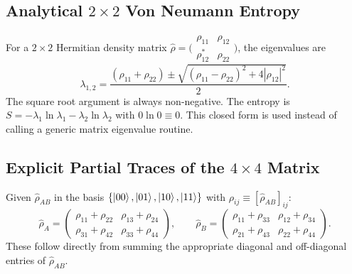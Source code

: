 \documentclass[12pt,a4paper]{article}
\newcommand{\rhohat}{\hat{\rho}}
\begin{document}
\subsection{\texorpdfstring{Analytical $2\times2$ Von Neumann Entropy}{Analytical 2x2 Von Neumann Entropy}}
\label{app:entropy2x2}

For a $2\times2$ Hermitian density matrix
$\hat{\rho}=\bigl(\begin{smallmatrix}\rho_{11}&\rho_{12}\\\rho_{12}^*&\rho_{22}
\end{smallmatrix}\bigr)$,
the eigenvalues are
\begin{equation}
  \lambda_{1,2} = \frac{(\rho_{11}+\rho_{22})
    \pm\sqrt{(\rho_{11}-\rho_{22})^2+4|\rho_{12}|^2}}{2}.
  \label{app:eig2x2}
\end{equation}
The square root argument is always non-negative.  The entropy is
$S = -\lambda_1\ln\lambda_1 - \lambda_2\ln\lambda_2$ with $0\ln0\equiv0$.
This closed form is used instead of calling a generic matrix eigenvalue
routine.

\subsection{\texorpdfstring{Explicit Partial Traces of the $4\times4$ Matrix}{Explicit Partial Traces of the 4x4 Matrix}}
\label{app:partial}

Given $\rhohat_{AB}$ in the basis $\{\ket{00},\ket{01},\ket{10},\ket{11}\}$
with $\rho_{ij}\equiv[\rhohat_{AB}]_{ij}$:
\begin{equation}
  \hat{\rho}_A
  = \begin{pmatrix}\rho_{11}+\rho_{22} & \rho_{13}+\rho_{24}\\
                   \rho_{31}+\rho_{42} & \rho_{33}+\rho_{44}\end{pmatrix},
  \qquad
  \hat{\rho}_B
  = \begin{pmatrix}\rho_{11}+\rho_{33} & \rho_{12}+\rho_{34}\\
                   \rho_{21}+\rho_{43} & \rho_{22}+\rho_{44}\end{pmatrix}.
  \label{app:partial_trace}
\end{equation}
These follow directly from summing the appropriate diagonal and
off-diagonal entries of $\rhohat_{AB}$.
\end{document}
